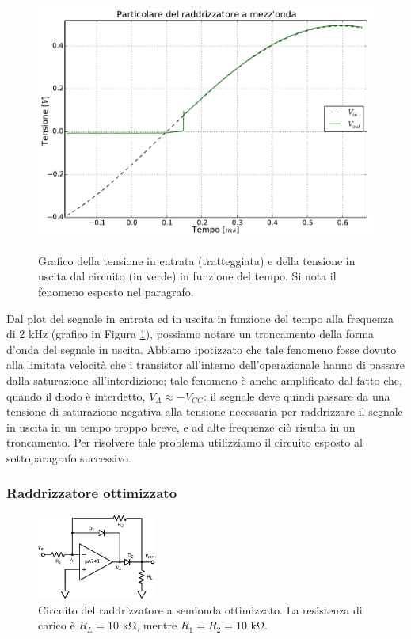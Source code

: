 \begin{figure}[H]
 \centering
   {\includegraphics[width=11.5cm]{../E05/latex/zoom.pdf}}
 \caption{Grafico della tensione in entrata (tratteggiata) e della tensione in uscita dal circuito (in verde) in funzione del tempo. Si nota il fenomeno esposto nel paragrafo.}
 \label{gr5:problema}
\end{figure}

Dal plot del segnale in entrata ed in uscita in funzione del tempo alla frequenza di 2 \si{\kilo\hertz} (grafico in Figura \ref{gr5:problema}), possiamo notare un troncamento della forma d'onda del segnale in uscita. Abbiamo ipotizzato che tale fenomeno fosse dovuto alla limitata velocità che i transistor all'interno dell'operazionale hanno di passare dalla saturazione all'interdizione; tale fenomeno è anche amplificato dal fatto che, quando il diodo è interdetto, $V_{A} \approx -V_{CC}$: il segnale deve quindi passare da una tensione di saturazione negativa alla tensione necessaria per raddrizzare il segnale in uscita in un tempo troppo breve, e ad alte frequenze ciò risulta in un troncamento. Per risolvere tale problema utilizziamo il circuito esposto al sottoparagrafo successivo.

\subsubsection{Raddrizzatore ottimizzato}

\begin{figure}
  \begin{center}
    \includegraphics[width=0.350\textwidth]{../E05/latex/c_rectifier_B.pdf}
  \end{center}
  \caption{Circuito del raddrizzatore a semionda ottimizzato. La resistenza di carico è $R_L=10$ \si{\kilo\ohm}, mentre $R_1=R_2=10$ \si{\kilo\ohm}.}
  \label{cir5:raddrizz_2}
\end{figure}

